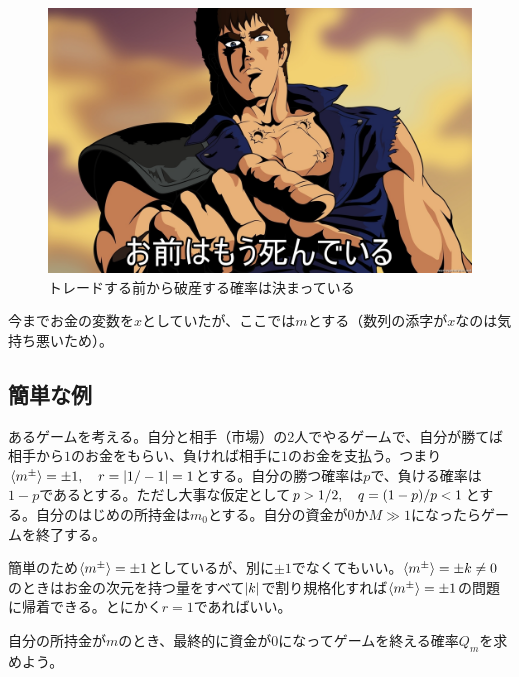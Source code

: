 \documentclass[twoside,openright,a4paper,papersize,uplatex,dvipdfmx]{jsarticle}
\newcommand{\rrr}{r} %
\begin{document}
  \begin{figure}[htbp]
    \centering
    \includegraphics[width=120mm]{./fig/81011344.jpg}
    \caption{トレードする前から破産する確率は決まっている}
    \label{fig: お前はもう死んでいる}
  \end{figure}

  今までお金の変数を$x$としていたが、ここでは$m$とする（数列の添字が$x$なのは気持ち悪いため）。

  \subsection{簡単な例}
  \label{subsec: 簡単な例}
  あるゲームを考える。自分と相手（市場）の2人でやるゲームで、自分が勝てば相手から$1$のお金をもらい、負ければ相手に$1$のお金を支払う。つまり$\expval{ m^{\pm} } = \pm 1 \qc \rrr = \abs{1 / -1} = 1$とする。自分の勝つ確率は$p$で、負ける確率は$1 - p$であるとする。ただし大事な仮定として$p > 1/2 \qc q = (1 - p) / p < 1$とする。自分のはじめの所持金は$m_{0}$とする。自分の資金が$0$か$M \gg 1$になったらゲームを終了する。

  簡単のため$\expval{ m^{\pm} } = \pm 1$としているが、別に$\pm 1$でなくてもいい。$\expval{ m^{\pm} } = \pm k \neq 0$のときはお金の次元を持つ量をすべて$\abs{k}$で割り規格化すれば$\expval{ m^{\pm} } = \pm 1$の問題に帰着できる。とにかく$\rrr = 1$であればいい。

  自分の所持金が$m$のとき、最終的に資金が$0$になってゲームを終える確率$Q_{m}$を求めよう。
\end{document}
